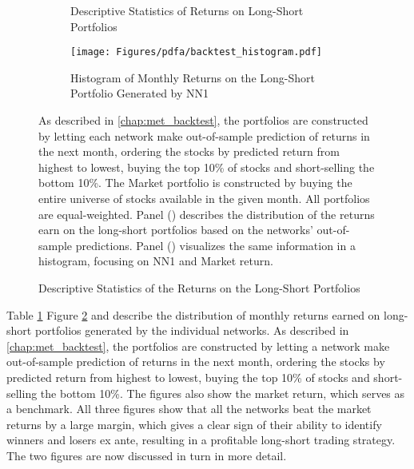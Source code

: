 		
		\begin{figure}	
			\centering		
			\begin{subfigure}[t]{\textwidth}
				\centering	
				
				\caption{Descriptive Statistics of Returns on Long-Short Portfolios}
				\label{tab:backtest_descriptives_models}
			\end{subfigure}
			
			\begin{subfigure}[t]{\textwidth}
				\texttt{[image: Figures/pdfa/backtest\_histogram.pdf]}
				\caption{Histogram of Monthly Returns on the Long-Short Portfolio Generated by NN1}
				\label{fig:backtest_histogram}
			\end{subfigure}
			\caption{Descriptive Statistics of the Returns on the Long-Short Portfolios}
			\medskip
			\small
			As described in \ref{chap:met_backtest}, the portfolios are constructed by letting each network make out-of-sample prediction of returns in the next month, ordering the stocks by predicted return from highest to lowest, buying the top 10\% of stocks and short-selling the bottom 10\%. The Market portfolio is constructed by buying the entire universe of stocks available in the given month. All portfolios are equal-weighted. Panel () describes the distribution of the returns earn on the long-short portfolios based on the networks' out-of-sample predictions. Panel () visualizes the same information in a histogram, focusing on NN1 and Market return. 
			\label{fig:backtest_descriptives}
		\end{figure} 
			
		Table \ref{tab:backtest_descriptives_models} Figure \ref{fig:backtest_histogram}  and describe the distribution of monthly returns earned on long-short portfolios generated by the individual networks. As described in \ref{chap:met_backtest}, the portfolios are constructed by letting a network make out-of-sample prediction of returns in the next month, ordering the stocks by predicted return from highest to lowest, buying the top 10\% of stocks and short-selling the bottom 10\%. The figures also show the market return, which serves as a benchmark. All three figures show that all the networks beat the market returns by a large margin, which gives a clear sign of their ability to identify winners and losers ex ante, resulting in a profitable long-short trading strategy. The two figures are now discussed in turn in more detail.
		
